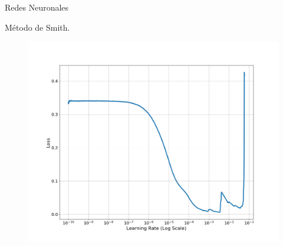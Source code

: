 \documentclass{beamer}
\begin{document}
\begin{frame}{Redes Neuronales}
    
    M\'etodo de Smith.
                            
    \begin{figure}[]
        \includegraphics[scale=0.26]{learning_rate_post}
    \end{figure}


\end{frame}
\end{document}
